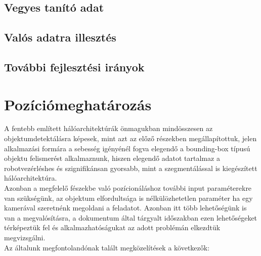\documentclass{article}
\begin{document}
\subsection{Vegyes tanító adat}

\subsection{Valós adatra illesztés}

\subsection{További fejlesztési irányok}





\section{Pozíciómeghatározás}
A fentebb említett hálóarchitektúrák önmagukban mindösszesen az objektumdetektálásra képesek, mint azt az előző
részekben megállapítottuk, jelen alkalmazási formára a sebesség igényénél fogva elegendő a bounding-box típusú
objektu felismerést alkalmaznunk, hiszen elegendő adatot tartalmaz a robotvezérléshes és szignifikánsan gyorsabb,
mint a szegmentálással is kiegészített hálóarchitektúra.\\[5pt]
Azonban a megfelelő fészekbe való pozícionáláshoz további input paraméterekre van szükségünk, az objektum elfordultsága
is nélkülözhetetlen paraméter ha egy kamerával szeretnénk megoldani a feladatot. Azonban itt több lehetőségünk is van a 
megvalósításra, a dokumentum által tárgyalt időszakban ezen lehetőségeket térképeztük fel és alkalmazhatóságukat 
az adott problémán elkezdtük megvizsgálni.\\
Az általunk megfontolandónak talált megközelítések a következők:
\end{document}

